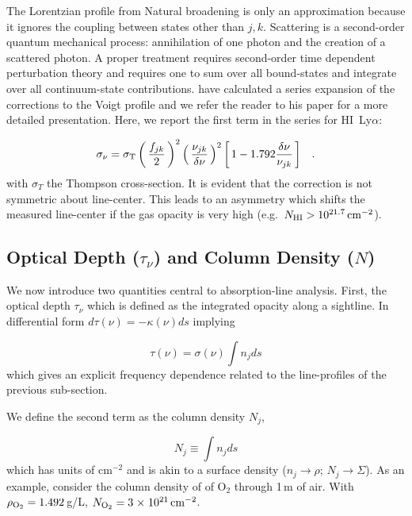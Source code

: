\documentclass[graybox]{svmult}
\newcommand{\HI}{H{\sc I}}
\def\lya{Ly$\alpha$}
\def\ltk{\left [ \,}
\def\ltp{\left ( \,}
\def\rtk{\, \right  ] }
\def\rtp{\, \right  ) }
\def\sci#1{{\; \times \; 10^{#1}}}
\def\perd{\;\;\; .}
\newcommand{\mnhi}{N_{\rm HI}}
\def\cm#1{\, {\rm cm^{#1}}}
\begin{document}
The Lorentzian profile from Natural broadening is only an approximation
because it ignores the coupling between states other than $j,k$.
Scattering is a second-order quantum mechanical process: annihilation of 
one photon and the creation of a scattered photon.
A proper treatment requires second-order time dependent perturbation
theory and requires one to sum over all bound-states and integrate over
all continuum-state contributions.
\cite{lee03} have calculated a series expansion of the corrections
to the Voigt profile and we refer the reader to his paper for a
more detailed presentation.  Here, we report the first term
in the series for \HI\ \lya:

\begin{equation}
\sigma_\nu = \sigma_{\rm T} \ltp \frac{f_{jk}}{2} \rtp^2 
\ltp \frac{\nu_{jk}}{\delta\nu} \rtp^2
\ltk 1 - 1.792 \frac{\delta\nu}{\nu_{jk}} \rtk  \perd
\end{equation}
with $\sigma_T$ the Thompson cross-section.
It is evident that the correction is not symmetric about line-center.
This leads to an asymmetry which
shifts the measured line-center if the gas opacity
is very high (e.g.\ $\mnhi > 10^{21.7} \cm{-2}$).

\subsection{Optical Depth ($\tau_\nu$) and Column Density ($N$)}
\label{subsec:tauN}

We now introduce two quantities central to absorption-line analysis.
First, the optical depth $\tau_\nu$ which is defined as the integrated
opacity along a sightline.  In differential form
$d\tau(\nu) = -\kappa(\nu) ds$ implying

\begin{equation}
\tau(\nu) = \sigma(\nu) \int n_j ds
\end{equation}
which gives an explicit frequency dependence related to the line-profiles
of the previous sub-section.

We define the second term as the column density $N_j$,

\begin{equation}
N_j \equiv \int n_j ds
\end{equation}
which has units of cm$^{-2}$ and is akin to a surface density
($n_j \to \rho$; $N_j \to \Sigma$).
As an example, consider the column density of 
of O$_2$ through 1\,m of air.  
With $\rho_{\rm O_2} = 1.492$\,g/L,
$N_{\rm O_2} = 3\sci{21} \cm{-2}$.
\end{document}
